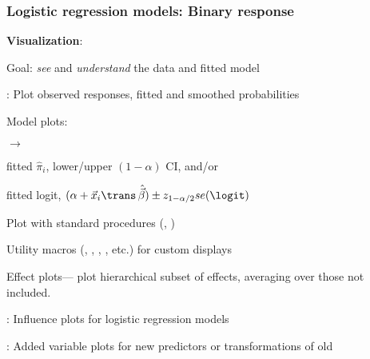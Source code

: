\begin{frame}
  \frametitle{Logistic regression models: Binary response}
  \begin{itemize}
	\item{\large\bfseries Visualization}:
      \begin{itemize*}
	  \item Goal: \emph{see} and \emph{understand} the data and fitted model
	  \item {}: Plot observed responses, fitted and smoothed probabilities
	  \item Model plots:
    	\begin{itemize*}
		\item {} $\rightarrow$ 
    	   \begin{itemize*}
			\item fitted $\hat{\pi}_i$, lower/upper $(1-\alpha)$ CI, and/or 
			\item fitted logit, $(\alpha + \vec{x}_{i}\trans \,  \hat{\vec{\beta}}) \pm
			z_{1-\alpha/2} se(\logit)$
    	   \end{itemize*}
			
		\item Plot with standard procedures (, )
		\item Utility macros (, , , , etc.)
		for custom displays
		\end{itemize*}
	  \item Effect plots--- plot hierarchical subset of effects, averaging over
	  those not included.
	  \item {}: Influence plots for logistic regression models
	  \item {}: Added variable plots for new predictors or transformations of old
	  \end{itemize*}
  \end{itemize}
\end{frame}

